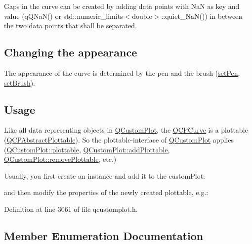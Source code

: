 Gaps in the curve can be created by adding data points with Na\+N as key and value ({\ttfamily q\+Q\+Na\+N()} or {\ttfamily std\+::numeric\+\_\+limits$<$double$>$\+::quiet\+\_\+\+Na\+N()}) in between the two data points that shall be separated.\hypertarget{class_q_c_p_statistical_box_appearance}{}\subsection{Changing the appearance}\label{class_q_c_p_statistical_box_appearance}
The appearance of the curve is determined by the pen and the brush (\hyperlink{class_q_c_p_abstract_plottable_ab74b09ae4c0e7e13142fe4b5bf46cac7}{set\+Pen}, \hyperlink{class_q_c_p_abstract_plottable_a7a4b92144dca6453a1f0f210e27edc74}{set\+Brush}). \hypertarget{class_q_c_p_statistical_box_usage}{}\subsection{Usage}\label{class_q_c_p_statistical_box_usage}
Like all data representing objects in \hyperlink{class_q_custom_plot}{Q\+Custom\+Plot}, the \hyperlink{class_q_c_p_curve}{Q\+C\+P\+Curve} is a plottable (\hyperlink{class_q_c_p_abstract_plottable}{Q\+C\+P\+Abstract\+Plottable}). So the plottable-\/interface of \hyperlink{class_q_custom_plot}{Q\+Custom\+Plot} applies (\hyperlink{class_q_custom_plot_a32de81ff53e263e785b83b52ecd99d6f}{Q\+Custom\+Plot\+::plottable}, \hyperlink{class_q_custom_plot_ab7ad9174f701f9c6f64e378df77927a6}{Q\+Custom\+Plot\+::add\+Plottable}, \hyperlink{class_q_custom_plot_af3dafd56884208474f311d6226513ab2}{Q\+Custom\+Plot\+::remove\+Plottable}, etc.)

Usually, you first create an instance and add it to the custom\+Plot\+: 
\begin{DoxyCodeInclude}
\end{DoxyCodeInclude}
and then modify the properties of the newly created plottable, e.\+g.\+: 
\begin{DoxyCodeInclude}
\end{DoxyCodeInclude}


Definition at line 3061 of file qcustomplot.\+h.



\subsection{Member Enumeration Documentation}
\hypertarget{class_q_c_p_curve_a2710e9f79302152cff794c6e16cc01f1}{}
